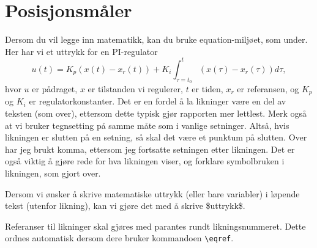 \section{Posisjonsmåler}\label{sec:pos_måler}
Dersom du vil legge inn matematikk, kan du bruke equation-miljøet, som under. Her har vi et uttrykk for en
PI-regulator
\begin{equation}
    u(t) = K_p (x(t)-x_r(t)) + K_i\int_{\tau=t_0}^t (x(\tau)-x_r(\tau))d\tau,
    \label{eq:PI_regulator_OLD}
\end{equation}
hvor $u$ er pådraget, $x$ er tilstanden vi regulerer, $t$ er tiden, $x_r$ er referansen, og $K_p$ og $K_i$ er regulatorkonstanter. Det er en fordel å la likninger være en del av teksten (som over), ettersom dette typisk gjør rapporten mer lettlest. Merk også at vi bruker tegnsetting på samme måte som i vanlige setninger. Altså,
hvis likningen er slutten på en setning, så skal det være et punktum på slutten. Over har jeg brukt komma, ettersom jeg fortsatte setningen etter likningen. Det er også viktig å gjøre rede for hva likningen viser,
og forklare symbolbruken i likningen, som gjort over.

Dersom vi ønsker å skrive matematiske uttrykk (eller bare variabler) i løpende tekst (utenfor likning),
kan vi gjøre det med å skrive \$uttrykk\$.

Referanser til likninger skal gjøres med parantes rundt likningsnummeret. Dette ordnes automatisk dersom dere
bruker kommandoen \texttt{\textbackslash eqref}.
